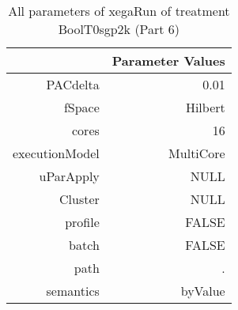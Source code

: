 \begin{table}[ht]
\centering
\begin{tabular}{rr}
  \hline
 & Parameter Values \\ 
  \hline
PACdelta & 0.01 \\ 
  fSpace & Hilbert \\ 
  cores & 16 \\ 
  executionModel & MultiCore \\ 
  uParApply & NULL \\ 
  Cluster & NULL \\ 
  profile & FALSE \\ 
  batch & FALSE \\ 
  path & . \\ 
  semantics & byValue \\ 
   \hline
\end{tabular}
\caption{ All parameters of xegaRun of treatment BoolT0sgp2k 
 (Part 6)} 
\end{table}

